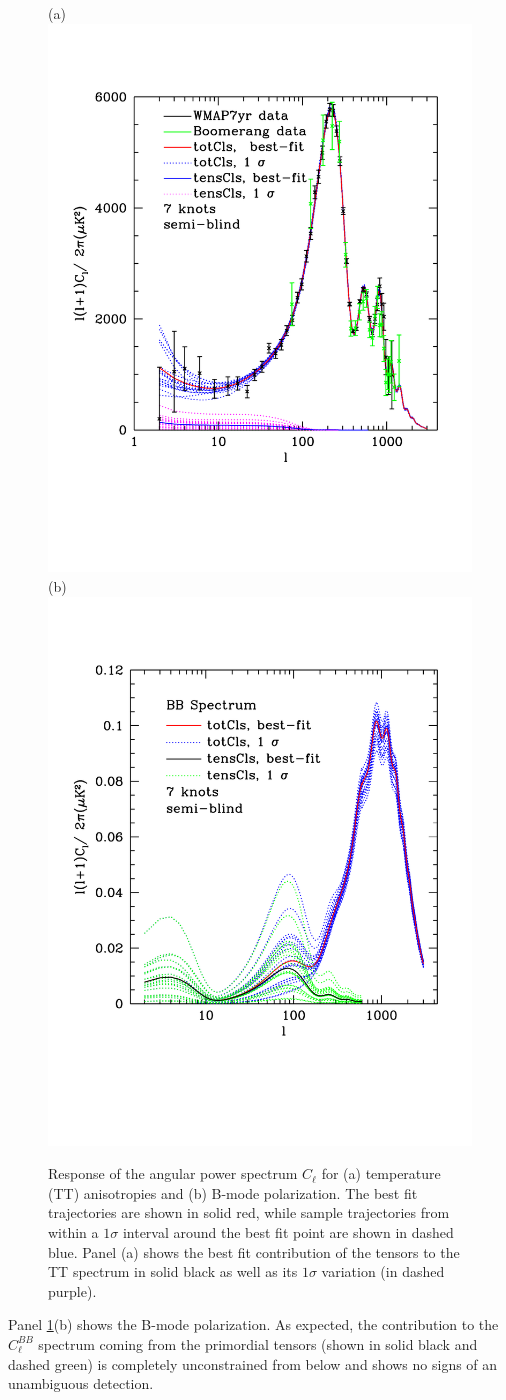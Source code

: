 \documentclass[a4paper,11pt]{article}
\begin{document}
\begin{figure}
  (a)\includegraphics[width=0.45\linewidth]{p7cubicspline_TT}
  (b)\includegraphics[width=0.45\linewidth]{p7cubicspline_BB}
  \caption{Response of the angular power spectrum $C_\ell$ for (a)
    temperature (TT) anisotropies and (b) B-mode polarization. The
    best fit trajectories are shown in solid red, while sample
    trajectories from within a $1\sigma$ interval around the best fit
    point are shown in dashed blue. Panel (a) shows the best fit
    contribution of the tensors to the TT spectrum in solid black as
    well as its $1\sigma$ variation (in dashed purple).}
  \label{fig:7knot_Cl_TT_BB}
\end{figure}
Panel \ref{fig:7knot_Cl_TT_BB}(b) shows the B-mode polarization.  As
expected, the contribution to the $C_\ell^{BB}$ spectrum coming from
the primordial tensors (shown in solid black and dashed green) is
completely unconstrained from below and shows no signs of an
unambiguous detection.
\end{document}
